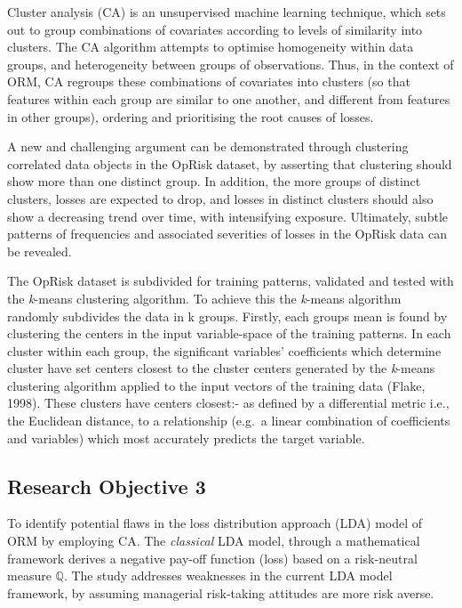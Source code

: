 \documentclass[]{DissertateUSU}
\begin{document}
Cluster analysis (CA) is an unsupervised machine learning technique,
which sets out to group combinations of covariates according to levels
of similarity into clusters. The CA algorithm attempts to optimise
homogeneity within data groups, and heterogeneity between groups of
observations. Thus, in the context of ORM, CA regroups these
combinations of covariates into clusters (so that features within each
group are similar to one another, and different from features in other
groups), ordering and prioritising the root causes of losses.\medskip

A new and challenging argument can be demonstrated through clustering
correlated data objects in the OpRisk dataset, by asserting that
clustering should show more than one distinct group. In addition, the
more groups of distinct clusters, losses are expected to drop, and
losses in distinct clusters should also show a decreasing trend over
time, with intensifying exposure. Ultimately, subtle patterns of
frequencies and associated severities of losses in the OpRisk data can
be revealed.\medskip  

The OpRisk dataset is subdivided for training patterns, validated and
tested with the \emph{k}-means clustering algorithm. To achieve this the
\emph{k}-means algorithm randomly subdivides the data in k groups.
Firstly, each groups mean is found by clustering the centers in the
input variable-space of the training patterns. In each cluster within
each group, the significant variables' coefficients which determine
cluster have set centers closest to the cluster centers generated by the
\emph{k}-means clustering algorithm applied to the input vectors of the
training data (Flake, 1998). These clusters have centers closest:- as
defined by a differential metric i.e., the Euclidean distance, to a
relationship (e.g.~a linear combination of coefficients and variables)
which most accurately predicts the target variable.

\subsection{Research Objective 3}

To identify potential flaws in the loss distribution approach (LDA)
model of ORM by employing CA. The \textit{classical} LDA model, through
a mathematical framework derives a negative pay-off function (loss)
based on a risk-neutral measure \(\mathbb{Q}\). The study addresses
weaknesses in the current LDA model framework, by assuming managerial
risk-taking attitudes are more risk averse.\medskip
\end{document}
